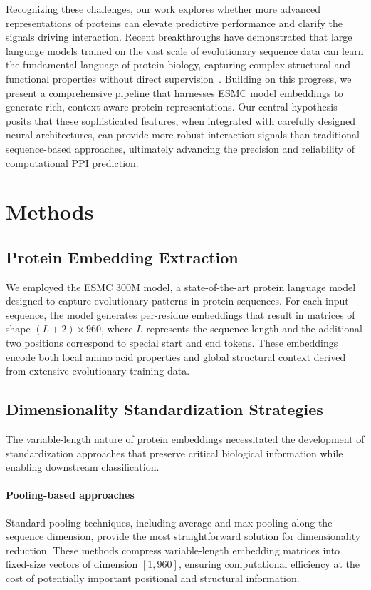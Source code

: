 \documentclass{article}
\begin{document}
Recognizing these challenges, our work explores whether more advanced representations of proteins can elevate predictive performance and clarify the signals driving interaction. Recent breakthroughs have demonstrated that large language models trained on the vast scale of evolutionary sequence data can learn the fundamental language of protein biology, capturing complex structural and functional properties without direct supervision~\citep{evolution_language_model_2023}. Building on this progress, we present a comprehensive pipeline that harnesses ESMC model embeddings to generate rich, context-aware protein representations. Our central hypothesis posits that these sophisticated features, when integrated with carefully designed neural architectures, can provide more robust interaction signals than traditional sequence-based approaches, ultimately advancing the precision and reliability of computational PPI prediction.
	
	
	\section{Methods}

	\subsection{Protein Embedding Extraction}

	We employed the ESMC 300M model, a state-of-the-art protein language model designed to capture evolutionary patterns in protein sequences. For each input sequence, the model generates per-residue embeddings that result in matrices of shape $(L+2) \times 960$, where $L$ represents the sequence length and the additional two positions correspond to special start and end tokens. These embeddings encode both local amino acid properties and global structural context derived from extensive evolutionary training data.
	
	\subsection{Dimensionality Standardization Strategies}

	The variable-length nature of protein embeddings necessitated the development of standardization approaches that preserve critical biological information while enabling downstream classification.
	
	\paragraph{Pooling-based approaches} Standard pooling techniques, including average and max pooling along the sequence dimension, provide the most straightforward solution for dimensionality reduction. These methods compress variable-length embedding matrices into fixed-size vectors of dimension $[1, 960]$, ensuring computational efficiency at the cost of potentially important positional and structural information.
\end{document}
